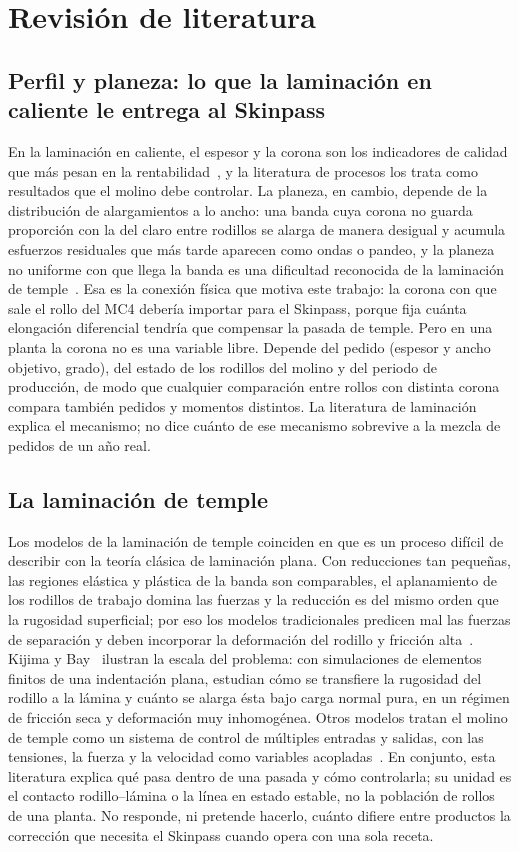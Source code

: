 \section{Revisión de literatura}
\label{sec:literatura}

\subsection{Perfil y planeza: lo que la laminación en caliente le entrega al Skinpass}
En la laminación en caliente, el espesor y la corona son los indicadores de calidad que más pesan en la
rentabilidad~\cite{peng2014}, y la literatura de procesos los trata como resultados que el molino debe controlar. La
planeza, en cambio, depende de la distribución de alargamientos a lo ancho: una banda cuya corona no guarda
proporción con la del claro entre rodillos se alarga de manera desigual y acumula esfuerzos residuales que más tarde
aparecen como ondas o pandeo, y la planeza no uniforme con que llega la banda es una dificultad reconocida de la
laminación de temple~\cite{lenard2014}. Esa es la conexión física que motiva este trabajo: la corona con que
sale el rollo del MC4 debería importar para el Skinpass, porque fija cuánta elongación diferencial tendría que
compensar la pasada de temple. Pero en una planta la corona no es una variable libre. Depende del pedido (espesor y
ancho objetivo, grado), del estado de los rodillos del molino y del periodo de producción, de modo que cualquier
comparación entre rollos con distinta corona compara también pedidos y momentos distintos. La literatura de
laminación explica el mecanismo; no dice cuánto de ese mecanismo sobrevive a la mezcla de pedidos de un año real.

\subsection{La laminación de temple}
Los modelos de la laminación de temple coinciden en que es un proceso difícil de describir con la teoría clásica de
laminación plana. Con reducciones tan pequeñas, las regiones elástica y plástica de la banda son comparables, el
aplanamiento de los rodillos de trabajo domina las fuerzas y la reducción es del mismo orden que la rugosidad
superficial; por eso los modelos tradicionales predicen mal las fuerzas de separación y deben incorporar la
deformación del rodillo y fricción alta~\cite{lenard2014}. Kijima y Bay~\cite{kijima2008} ilustran la escala del
problema: con simulaciones de elementos finitos de una indentación plana, estudian cómo se transfiere la rugosidad del
rodillo a la lámina y cuánto se alarga ésta bajo carga normal pura, en un régimen de fricción seca y deformación muy
inhomogénea. Otros modelos tratan el molino de temple como un sistema de control de múltiples entradas y salidas, con
las tensiones, la fuerza y la velocidad como variables acopladas~\cite{lenard2014}. En conjunto, esta literatura
explica qué pasa dentro de una pasada y cómo controlarla; su unidad es el contacto rodillo--lámina o la línea en
estado estable, no la población de rollos de una planta. No responde, ni pretende hacerlo, cuánto difiere entre
productos la corrección que necesita el Skinpass cuando opera con una sola receta.

